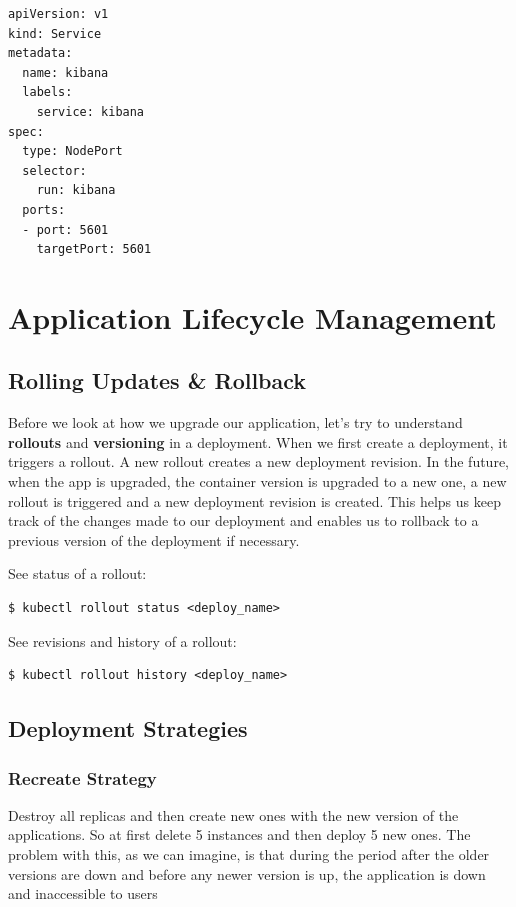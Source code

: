 \documentclass{article}
\newenvironment{codetemplate}[1][]{%
  \mybasecolorbox[#1]
  \itshape
}{%
  \endmybasecolorbox
}
\begin{document}
\begin{codetemplate}{}
\begin{verbatim}
apiVersion: v1
kind: Service
metadata:
  name: kibana
  labels:
	service: kibana
spec:
  type: NodePort
  selector:
	run: kibana
  ports:
  - port: 5601
	targetPort: 5601
\end{verbatim}
\end{codetemplate}

\newpage
\section{Application Lifecycle Management}

\subsection{Rolling Updates \& Rollback}

Before we look at how we upgrade our application, let's try to understand \textbf{rollouts} and \textbf{versioning} in a deployment. When we first create a deployment, it triggers a rollout. A new rollout creates a new deployment revision. In the future, when the app is upgraded, the container version is upgraded to a new one, a new rollout is triggered and a new deployment revision is created. This helps us keep track of the changes made to our deployment and enables us to rollback to a previous version of the deployment if necessary.

See status of a rollout:
\begin{codetemplate}{}
\begin{verbatim}
$ kubectl rollout status <deploy_name>
\end{verbatim}
\end{codetemplate}

See revisions and history of a rollout:
\begin{codetemplate}{}
\begin{verbatim}
$ kubectl rollout history <deploy_name>
\end{verbatim}
\end{codetemplate}

\subsection{Deployment Strategies}

\subsubsection{Recreate Strategy}
Destroy all replicas and then create new ones with the new version of the applications. So at first delete 5 instances and then deploy 5 new ones. The problem with this, as we can imagine, is that during the period after the older versions are down and before any newer version is up, the application is down and inaccessible to users
\end{document}
